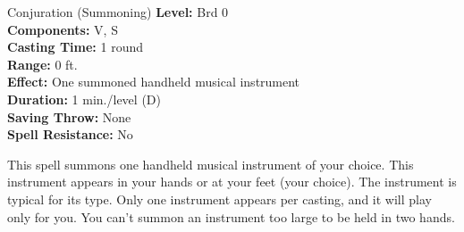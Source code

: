 {Conjuration (Summoning)}
{
	\textbf{Level:}
	Brd 0\\
	\textbf{Components:}
	V, S\\
	\textbf{Casting Time:}
	1 round\\
	\textbf{Range:}
	0 ft.\\
	\textbf{Effect:}
	One summoned handheld musical instrument\\
	\textbf{Duration:}
	1 min./level (D)\\
	\textbf{Saving Throw:}
	None\\
	\textbf{Spell Resistance:}
	No\\
}
{
	This spell summons one handheld musical instrument of your choice. This instrument appears in your hands or at your feet (your choice). The instrument is typical for its type. Only one instrument appears per casting, and it will play only for you. You can't summon an instrument too large to be held in two hands.

}
